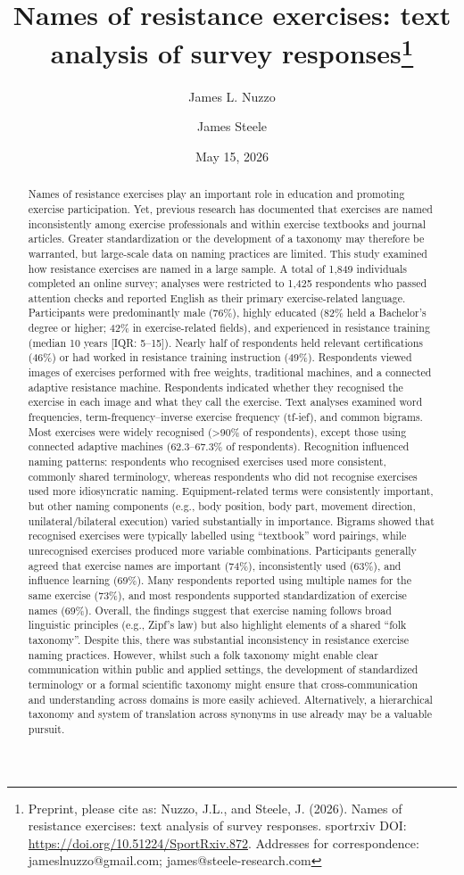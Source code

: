 \documentclass[
]{article}
\title{Names of resistance exercises: text analysis of survey
responses\thanks{Preprint, please cite as: Nuzzo, J.L., and Steele, J.
(2026). Names of resistance exercises: text analysis of survey
responses. sportrxiv DOI: \url{https://doi.org/10.51224/SportRxiv.872}.
Addresses for correspondence: jameslnuzzo@gmail.com;
james@steele-research.com}}
\author[1]{James L. Nuzzo}
\author[2,3,4]{James Steele}
\affil[1]{The Nuzzo Letter, West Leederville, Western Australia,
Australia}
\affil[2]{Steele Research Limited, Eastleigh, Hampshire, UK}
\affil[3]{MacroFactor, Stronger by Science Technologies LLC, Raleigh,
North Carolina, USA}
\affil[4]{School of Health and Biomedical Sciences, Royal Melbourne
Institute of Technology, Melbourne, VIC, Australia}
\date{May 15, 2026}
\begin{document}
\maketitle
\begin{abstract}
Names of resistance exercises play an important role in education and
promoting exercise participation. Yet, previous research has documented
that exercises are named inconsistently among exercise professionals and
within exercise textbooks and journal articles. Greater standardization
or the development of a taxonomy may therefore be warranted, but
large-scale data on naming practices are limited. This study examined
how resistance exercises are named in a large sample. A total of 1,849
individuals completed an online survey; analyses were restricted to
1,425 respondents who passed attention checks and reported English as
their primary exercise-related language. Participants were predominantly
male (76\%), highly educated (82\% held a Bachelor's degree or higher;
42\% in exercise-related fields), and experienced in resistance training
(median 10 years {[}IQR: 5--15{]}). Nearly half of respondents held
relevant certifications (46\%) or had worked in resistance training
instruction (49\%). Respondents viewed images of exercises performed
with free weights, traditional machines, and a connected adaptive
resistance machine. Respondents indicated whether they recognised the
exercise in each image and what they call the exercise. Text analyses
examined word frequencies, term-frequency--inverse exercise frequency
(tf-ief), and common bigrams. Most exercises were widely recognised
(\textgreater90\% of respondents), except those using connected adaptive
machines (62.3--67.3\% of respondents). Recognition influenced naming
patterns: respondents who recognised exercises used more consistent,
commonly shared terminology, whereas respondents who did not recognise
exercises used more idiosyncratic naming. Equipment-related terms were
consistently important, but other naming components (e.g., body
position, body part, movement direction, unilateral/bilateral execution)
varied substantially in importance. Bigrams showed that recognised
exercises were typically labelled using ``textbook'' word pairings,
while unrecognised exercises produced more variable combinations.
Participants generally agreed that exercise names are important (74\%),
inconsistently used (63\%), and influence learning (69\%). Many
respondents reported using multiple names for the same exercise (73\%),
and most respondents supported standardization of exercise names (69\%).
Overall, the findings suggest that exercise naming follows broad
linguistic principles (e.g., Zipf's law) but also highlight elements of
a shared ``folk taxonomy''. Despite this, there was substantial
inconsistency in resistance exercise naming practices. However, whilst
such a folk taxonomy might enable clear communication within public and
applied settings, the development of standardized terminology or a
formal scientific taxonomy might ensure that cross-communication and
understanding across domains is more easily achieved. Alternatively, a
hierarchical taxonomy and system of translation across synonyms in use
already may be a valuable pursuit.
\end{abstract}
\end{document}
